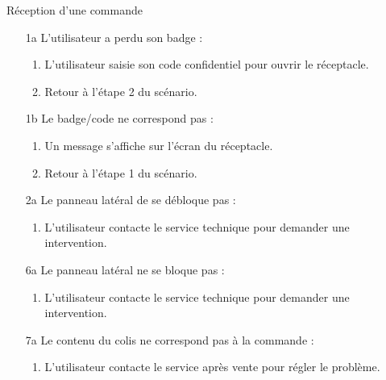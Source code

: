\begin{UseCase}{Réception d'une commande}
\begin{UseCaseExtension}
    \begin{enumerate}
        \item[1a] L'utilisateur a perdu son badge :
            \begin{enumerate}
                \item L'utilisateur saisie son code confidentiel pour ouvrir le
                    réceptacle.
                \item Retour à l'étape 2 du scénario.
            \end{enumerate}
        \item[1b] Le badge/code ne correspond pas :
            \begin{enumerate}
                \item Un message s'affiche sur l'écran du réceptacle.
                \item Retour à l'étape 1 du scénario.
            \end{enumerate}
        \item[2a] Le panneau latéral de se débloque pas :
            \begin{enumerate}
                \item L'utilisateur contacte le service technique pour demander
                    une intervention.
            \end{enumerate}
        \item[6a] Le panneau latéral ne se bloque pas :
            \begin{enumerate}
                \item L'utilisateur contacte le service technique pour demander
                    une intervention.
            \end{enumerate}
        \item[7a] Le contenu du colis ne correspond pas à la commande :
            \begin{enumerate}
                \item L'utilisateur contacte le service après vente pour régler
                    le problème.
            \end{enumerate}
    \end{enumerate}
\end{UseCaseExtension}

\end{UseCase}
